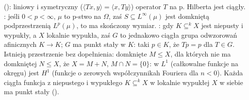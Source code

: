  ():  liniowy i symetryczny ($\langle Tx, y \rangle = \langle x, Ty \rangle$) operator $T$ na p. Hilberta jest ciągły.
: jeśli $0 < p < \infty$, $\mu$ to p-stwo na $\Omega$, zaś $S \subseteq L^\infty(\mu)$ jest domkniętą podprzestrzenią $L^p(\mu)$, to ma skończony wymiar.
: gdy $K \subseteq^k X$ jest niepusty i wypukły, a $X$ lokalnie wypukła, zaś $G$ to jednakowo ciągła grupa odwzorowań afinicznych $K \to K$; $G$ ma punkt stały w $K$: taki $p \in K$, że $Tp = p$ dla $T \in G$.
Istnieją przestrzenie bez dopełnienia: domknięte $M \le X$, dla których nie ma domkniętej $N \le X$, że $X = M + N$, $M \cap N = \{0\}$: w $L^1$ (całkowalne funkcje na okręgu) jest $H^1$ (funkcje o zerowych współczynnikah Fouriera dla $n < 0$).
Każda ciągła funkcja z niepustego i wypukłego $K \subseteq^k X$ w lokalnie wypukłej $X$ w siebie ma punkt stały ().
